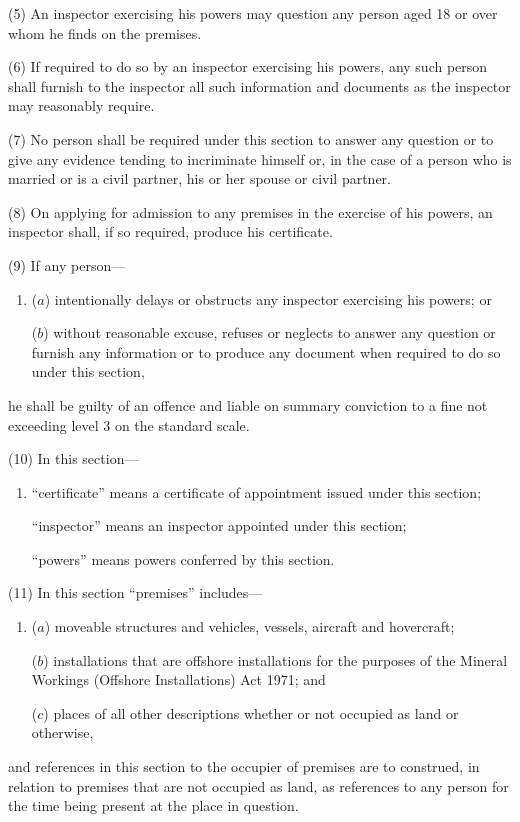 \documentclass[12pt,a4paper]{article}
\begin{document}
(5)
An inspector exercising his powers may question any person aged 18 or over whom he finds on the premises.

(6)
If required to do so by an inspector exercising his powers, any such person shall furnish to the inspector all such information and documents as the inspector may reasonably require.

(7)
No person shall be required under this section to answer any question or to give any evidence tending to incriminate himself or, in the case of a person who is married or is a civil partner, his or her spouse or civil partner.

(8)
On applying for admission to any premises in the exercise of his powers, an inspector shall, if so required, produce his certificate.

(9)
If any person---
\begin{enumerate}\item[]
($a$)
intentionally delays or obstructs any inspector exercising his powers; or

($b$)
without reasonable excuse, refuses or neglects to answer any question or furnish any information or to produce any document when required to do so under this section,
\end{enumerate}
he shall be guilty of an offence and liable on summary conviction to a fine not exceeding level 3 on the standard scale.

(10) In this section---
\begin{enumerate}\item[]
 “certificate” means a certificate of appointment issued under this section; 

“inspector” means an inspector appointed under this section; 

“powers” means powers conferred by this section.
\end{enumerate}

(11) In this section “premises” includes---
\begin{enumerate}\item[]
($a$)
moveable structures and vehicles, vessels, aircraft and hovercraft;

($b$)
installations that are offshore installations for the purposes of the Mineral Workings (Offshore Installations) Act 1971; and

($c$)
places of all other descriptions whether or not occupied as land or otherwise,
\end{enumerate}
and references in this section to the occupier of premises are to construed, in relation to premises that are not occupied as land, as references to any person for the time being present at the place in question.
\end{document}
